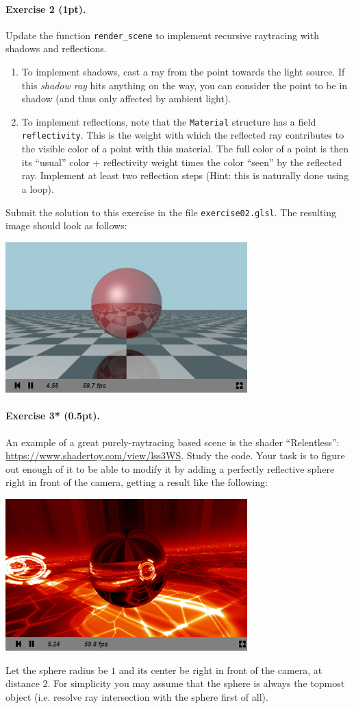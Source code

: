 \documentclass{article}
\newenvironment{exercise}[2]{\paragraph{Exercise #1 (#2pt).} }{
\medskip}
\begin{document}
\begin{exercise}{2}{1}
Update the function \verb#render_scene# to implement recursive raytracing with shadows and reflections.
\begin{enumerate}
\item To implement shadows, cast a ray from the point towards the light source. If this \emph{shadow ray} hits anything on the way, you can consider the point to be in shadow (and thus only affected by ambient light).
\item To implement reflections, note that the \verb#Material# structure has a field \verb#reflectivity#. This is the weight with which the reflected ray contributes to the visible color of a point with this material. The full color of a point is then its ``usual'' color + reflectivity weight times the color ``seen'' by the reflected ray. Implement at least two reflection steps (Hint: this is naturally done using a loop).
\end{enumerate}
Submit the solution to this exercise in the file \verb#exercise02.glsl#.
The resulting image should look as follows:
\begin{center}
\includegraphics[width=0.7\textwidth]{raytracing.png}
\end{center}
\end{exercise}

\begin{exercise}{3*}{0.5}
An example of a great purely-raytracing based scene is the shader ``Relentless'': \url{https://www.shadertoy.com/view/lss3WS}. Study the code. Your task is to figure out enough of it to be able to modify it by adding a perfectly reflective sphere right in front of the camera, getting a result like the following:
\begin{center}
\includegraphics[width=0.7\textwidth]{relentless.png}
\end{center}
Let the sphere radius be $1$ and its center be right in front of the camera, at distance $2$. For simplicity you may assume that the sphere is always the topmost object (i.e. resolve ray intersection with the sphere first of all).
\end{exercise}
\end{document}
